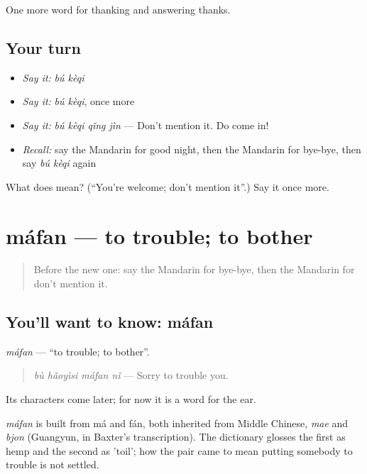 \begin{grammarlens}[title={What you've built}]
One more word for thanking and answering thanks.
\end{grammarlens}

\subsection*{Your turn}
\begin{itemize}
\raggedright
  \item \emph{Say it:} \emph{bú kèqi}
  \item \emph{Say it:} \emph{bú kèqi}, once more
  \item \emph{Say it:} \emph{bú kèqi qǐng jìn} — Don't mention it. Do come in!
  \item \emph{Recall:} say the Mandarin for good night, then the Mandarin for bye-bye, then say \emph{bú kèqi} again
\end{itemize}

\begin{tcolorbox}[breakable,colback=teal!4,colframe=teal!35!black,title={Before you move on}]
What does  mean? (\textquotedblleft{}You're welcome; don't mention it\textquotedblright{}.) Say it once more.
\end{tcolorbox}
\section[máfan]{máfan — to trouble; to bother}

\label{lesson:ZH-C77-mafan}



\begin{quote}
Before the new one: say the Mandarin for bye-bye, then the Mandarin for don't mention it.
\end{quote}

\subsection*{You'll want to know: máfan}
\emph{máfan} — \textquotedblleft{}to trouble; to bother\textquotedblright{}.

\begin{quote}
\emph{bù hǎoyìsi máfan nǐ} — Sorry to trouble you.
\end{quote}

Its characters come later; for now it is a word for the ear.

\begin{cousinweb}
\emph{máfan} is built from má and fán, both inherited from Middle Chinese, \emph{mae} and \emph{bjon} (Guangyun, in Baxter's transcription). The dictionary glosses the first as hemp and the second as 'toil'; how the pair came to mean putting somebody to trouble is not settled.
\end{cousinweb}

